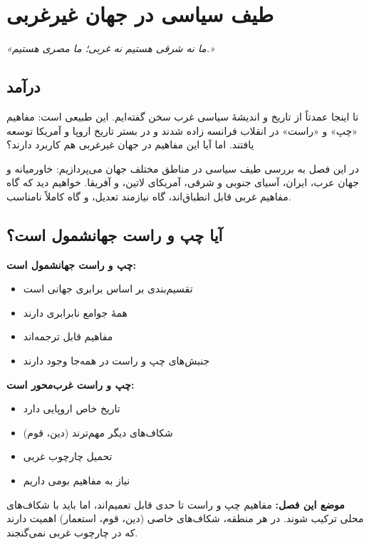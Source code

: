 \chapter{طیف سیاسی در جهان غیرغربی}

\begin{quotebox}
\textit{«ما نه شرقی هستیم نه غربی؛ ما مصری هستیم.»}
\end{quotebox}

\vspace{5mm}

\section*{درآمد}


تا اینجا عمدتاً از تاریخ و اندیشهٔ سیاسی غرب سخن گفته‌ایم. این طبیعی است: مفاهیم «چپ» و «راست» در انقلاب فرانسه زاده شدند و در بستر تاریخ اروپا و آمریکا توسعه یافتند. اما آیا این مفاهیم در جهان غیرغربی هم کاربرد دارند؟

در این فصل به بررسی طیف سیاسی در مناطق مختلف جهان می‌پردازیم: خاورمیانه و جهان عرب، ایران، آسیای جنوبی و شرقی، آمریکای لاتین، و آفریقا. خواهیم دید که گاه مفاهیم غربی قابل انطباق‌اند، گاه نیازمند تعدیل، و گاه کاملاً نامناسب.


\section{آیا چپ و راست جهانشمول است؟}

\begin{debatebox}

\textbf{چپ و راست جهانشمول است:}
\begin{itemize}
    \item تقسیم‌بندی بر اساس برابری جهانی است
    \item همهٔ جوامع نابرابری دارند
    \item مفاهیم قابل ترجمه‌اند
    \item جنبش‌های چپ و راست در همه‌جا وجود دارند
\end{itemize}



\textbf{چپ و راست غرب‌محور است:}
\begin{itemize}
    \item تاریخ خاص اروپایی دارد
    \item شکاف‌های دیگر مهم‌ترند (دین، قوم)
    \item تحمیل چارچوب غربی
    \item نیاز به مفاهیم بومی داریم
\end{itemize}


\vspace{3mm}
\textbf{موضع این فصل:} مفاهیم چپ و راست تا حدی قابل تعمیم‌اند، اما باید با شکاف‌های محلی ترکیب شوند. در هر منطقه، شکاف‌های خاصی (دین، قوم، استعمار) اهمیت دارند که در چارچوب غربی نمی‌گنجند.
\end{debatebox}

